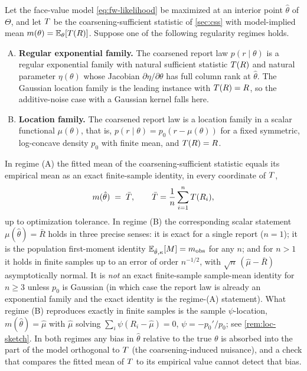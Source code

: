 \begin{theorem}
\label{thm:general-consistency}
Let the face-value model \eqref{eq:fw-likelihood} be maximized at an
interior point $\hat\theta$ of $\Theta$, and let $T$ be the
coarsening-sufficient statistic of \cref{sec:css} with model-implied
mean $m(\theta) = \mathbb{E}_\theta[T(R)]$. Suppose one of the following
regularity regimes holds.
\begin{enumerate}[(A)]
\item \textbf{Regular exponential family.} The coarsened report law
  $p(r \mid \theta)$ is a regular exponential family with natural
  sufficient statistic $T(R)$ and natural parameter $\eta(\theta)$
  whose Jacobian $\partial\eta / \partial\theta$ has full column rank
  at $\hat\theta$. The Gaussian location family is the leading instance
  with $T(R) = R$, so the additive-noise case with a Gaussian kernel
  falls here.
\item \textbf{Location family.} The coarsened report law is a location
  family in a scalar functional $\mu(\theta)$, that is, $p(r \mid
  \theta) = p_0(r - \mu(\theta))$ for a fixed symmetric, log-concave
  density $p_0$ with finite mean, and $T(R) = R$.
\end{enumerate}
In regime (A) the fitted mean of the coarsening-sufficient statistic
equals its empirical mean as an exact finite-sample identity, in every
coordinate of $T$,
\begin{equation}
  m(\hat\theta) \;=\; \bar{T},
  \qquad \bar{T} = \frac1n \sum_{i=1}^n T(R_i),
  \label{eq:general-consistency}
\end{equation}
up to optimization tolerance. In regime (B) the corresponding scalar
statement $\mu(\hat\theta) = \bar R$ holds in three precise senses: it
is exact for a single report ($n = 1$); it is the population
first-moment identity $\mathbb{E}_{\hat\theta,\kappa}[M] = m_{\mathrm{obs}}$ for
any $n$; and for $n > 1$ it holds in finite samples up to an error of
order $n^{-1/2}$, with $\sqrt{n}\,(\hat\mu - \bar R)$ asymptotically
normal. It is \emph{not} an exact finite-sample sample-mean identity
for $n \ge 3$ unless $p_0$ is Gaussian (in which case the report law is
already an exponential family and the exact identity is the regime-(A)
statement). What regime (B) reproduces exactly in finite samples is the
sample $\psi$-location, $m(\hat\theta) = \hat\mu$ with $\hat\mu$ solving
$\sum_i \psi(R_i - \hat\mu) = 0$, $\psi = -p_0'/p_0$; see
\cref{rem:loc-sketch}. In both regimes any bias in $\hat\theta$
relative to the true $\theta$ is absorbed into the part of the model
orthogonal to $T$ (the coarsening-induced nuisance), and a check that
compares the fitted mean of $T$ to its empirical value cannot detect
that bias.
\end{theorem}

